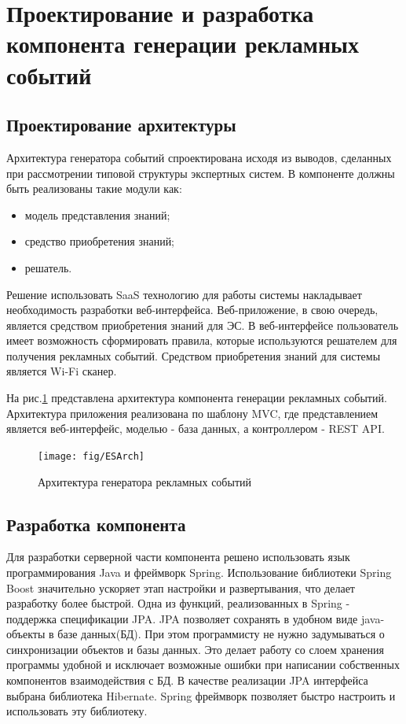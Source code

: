 \section{Проектирование и разработка компонента генерации рекламных событий}


\subsection{Проектирование архитектуры}

Архитектура генератора событий спроектирована исходя из выводов, сделанных при рассмотрении типовой структуры экспертных систем. В компоненте должны быть реализованы такие модули как:

\begin{itemize}
	\item модель представления знаний;
	\item средство приобретения знаний;
	\item решатель.
\end{itemize}

Решение использовать SaaS технологию для работы системы накладывает необходимость разработки веб-интерфейса. Веб-приложение, в свою очередь, является средством приобретения знаний для ЭС. В веб-интерфейсе пользователь имеет возможность сформировать правила, которые используются решателем для получения рекламных событий. Средством приобретения знаний для системы является Wi-Fi сканер.

На рис.\ref{fig:ESArch} представлена архитектура компонента генерации рекламных событий. Архитектура приложения реализована по шаблону MVC, где представлением является веб-интерфейс, моделью - база данных, а контроллером - REST API.

\begin{figure}[H]
	\centering
	\texttt{[image: fig/ESArch]}
	\caption{Архитектура генератора рекламных событий}
	\label{fig:ESArch}
\end{figure}

\subsection{Разработка компонента}

Для разработки серверной части компонента решено использовать язык программирования Java и фреймворк Spring. Использование библиотеки Spring Boost значительно ускоряет этап настройки и развертывания, что делает разработку более быстрой. Одна из функций, реализованных в Spring - поддержка спецификации JPA. JPA позволяет сохранять в удобном виде java-объекты в базе данных(БД). При этом программисту не нужно задумываться о синхронизации объектов и базы данных. Это делает работу со слоем хранения программы удобной и исключает возможные ошибки при написании собственных компонентов взаимодействия с БД. В качестве реализации JPA интерфейса выбрана библиотека Hibernate. Spring фреймворк позволяет быстро настроить и использовать эту библиотеку.

